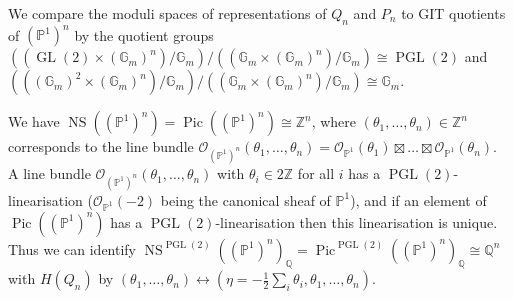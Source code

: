 \documentclass[10pt,a4paper]{amsart}
\theoremstyle{definition}
\def\Z{\mathds Z}
\def\Q{\mathds Q}
\def\G{\mathds G}
\def\P{\mathds P}
\def\O{\mathcal O}
\DeclareMathOperator{\GL}{GL}
\DeclareMathOperator{\PGL}{PGL}
\DeclareMathOperator{\Pic}{Pic}
\DeclareMathOperator{\NS}{NS}
\begin{document}
We compare the moduli spaces of representations of $Q_n$ and $P_n$ to GIT quotients 
of $(\P^1)^n$ by the quotient groups 
$((\GL(2)\times(\G_m)^n)/\G_m)/((\G_m\times(\G_m)^n)/\G_m)\cong\PGL(2)$ and
$(((\G_m)^2\times(\G_m)^n)/\G_m)/((\G_m\times(\G_m)^n)/\G_m)\cong\G_m$.


We have $\NS((\P^1)^n)=\Pic((\P^1)^n)\cong\Z^n$, where 
$(\theta_1,\ldots,\theta_n)\in\Z^n$ corresponds to the line bundle 
$\O_{(\P^1)^n}(\theta_1,\ldots,\theta_n)=\O_{\P^1}(\theta_1)\boxtimes\ldots\boxtimes
\O_{\P^1}(\theta_n)$. A line bundle 
$\O_{(\P^1)^n}(\theta_1,\ldots,\theta_n)$ with 
$\theta_i\in 2\Z$ for all $i$ has a $\PGL(2)$-linearisation ($\O_{\P^1}(-2)$
being the canonical sheaf of $\P^1$), and if an element of $\Pic((\P^1)^n)$ has a 
$\PGL(2)$-linearisation then this linearisation is unique. Thus we can identify 
$\NS^{\PGL(2)}((\P^1)^n)_\Q=\Pic^{\PGL(2)}((\P^1)^n)_\Q\cong\Q^n$ 
with $H(Q_n)$ by 
$(\theta_1,\ldots,\theta_n)\leftrightarrow(\eta=-\frac{1}{2}\sum_i\theta_i,\theta_1,
\ldots,\theta_n)$.
\end{document}
